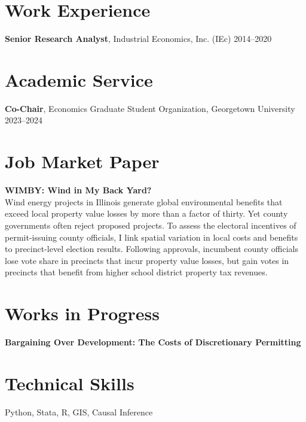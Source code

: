 \documentclass[11pt]{article}
\begin{document}
\section*{Work Experience}

\textbf{Senior Research Analyst}, Industrial Economics, Inc. (IEc) \hfill 2014–2020

\section*{Academic Service}

\textbf{Co-Chair}, Economics Graduate Student Organization, Georgetown University \hfill 2023–2024

\section*{Job Market Paper}

\textbf{WIMBY: Wind in My Back Yard?} \\
Wind energy projects in Illinois generate global environmental benefits that exceed local property value losses by more than a factor of thirty. Yet county governments often reject proposed projects. To assess the electoral incentives of permit-issuing county officials, I link spatial variation in local costs and benefits to precinct-level election results. Following approvals, incumbent county officials lose vote share in precincts that incur property value losses, but gain votes in precincts that benefit from higher school district property tax revenues.
\section*{Works in Progress}
\textbf{Bargaining Over Development: The Costs of Discretionary Permitting}



\section*{Technical Skills}
Python, Stata, R, GIS, Causal Inference

\end{document}
